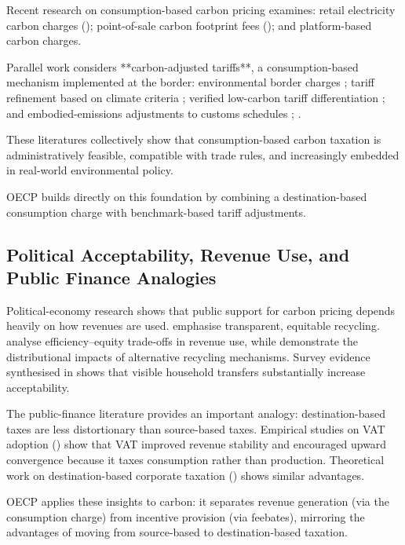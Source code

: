 \documentclass[12pt]{article}
\begin{document}
Recent research on consumption-based carbon pricing examines:
retail electricity carbon charges (\textcite{VogtSchilb2022});  
point-of-sale carbon footprint fees (\textcite{Summerfield2019});  
and platform-based carbon charges.

Parallel work considers **carbon-adjusted tariffs**,  
a consumption-based mechanism implemented at the border:  
environmental border charges \textcite{LockwoodWhalley2008};  
tariff refinement based on climate criteria \textcite{Colares2014};  
verified low-carbon tariff differentiation \textcite{ElectriciteDeFrance2019};  
and embodied-emissions adjustments to customs schedules  
\textcite{MoranWood2020}; \textcite{Brandi2023}.

These literatures collectively show that consumption-based carbon taxation is
administratively feasible, compatible with trade rules, and increasingly embedded in 
real-world environmental policy.

OECP builds directly on this foundation by combining a destination-based  
consumption charge with benchmark-based tariff adjustments.

\subsection{Political Acceptability, Revenue Use, and Public Finance Analogies}

Political-economy research shows that public support for carbon pricing depends
heavily on how revenues are used.  
\textcite{Metcalf2009, Metcalf2017} emphasise transparent, equitable recycling.  
\textcite{ParryWilliams1999} analyse efficiency–equity trade-offs in revenue 
use, while \textcite{Carbone2013} demonstrate the distributional impacts of  
alternative recycling mechanisms.  
Survey evidence synthesised in \textcite{Klenert2018} shows that visible household 
transfers substantially increase acceptability.

The public-finance literature provides an important analogy:  
destination-based taxes are less distortionary than source-based taxes.  
Empirical studies on VAT adoption (\textcite{KeenLockwood2006, KeenLockwood2010})  
show that VAT improved revenue stability and encouraged upward convergence  
because it taxes consumption rather than production.  
Theoretical work on destination-based corporate taxation 
(\textcite{Auerbach2010}) shows similar advantages.

OECP applies these insights to carbon:  
it separates revenue generation (via the consumption charge)  
from incentive provision (via feebates),  
mirroring the advantages of moving from source-based to destination-based taxation.
\end{document}

